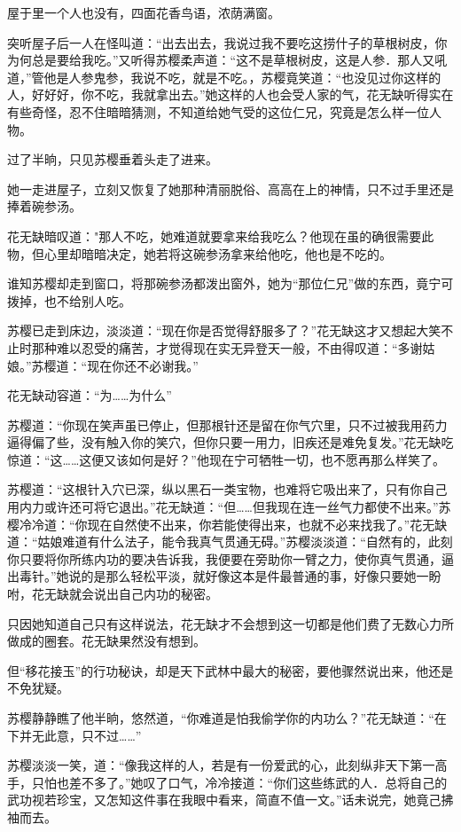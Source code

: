\documentclass[12pt,oneside]{book}
\begin{document}
屋于里一个人也没有，四面花香鸟语，浓荫满窗。

突听屋子后一人在怪叫道：``出去出去，我说过我不要吃这捞什子的草根树皮，你为何总是要给我吃。''又听得苏樱柔声道：``这不是草根树皮，这是人参．那人又吼道，''管他是人参鬼参，我说不吃，就是不吃。，苏樱竟笑道：``也没见过你这样的人，好好好，你不吃，我就拿出去。''她这样的人也会受人家的气，花无缺听得实在有些奇怪，忍不住暗暗猜测，不知道给她气受的这位仁兄，究竟是怎么样一位人物。

过了半晌，只见苏樱垂着头走了进来。

她一走进屋子，立刻又恢复了她那种清丽脱俗、高高在上的神情，只不过手里还是捧着碗参汤。

花无缺暗叹道："那人不吃，她难道就要拿来给我吃么？他现在虽的确很需要此物，但心里却暗暗决定，她若将这碗参汤拿来给他吃，他也是不吃的。

谁知苏樱却走到窗口，将那碗参汤都泼出窗外，她为``那位仁兄''做的东西，竟宁可拨掉，也不给别人吃。

苏樱已走到床边，淡淡道：``现在你是否觉得舒服多了？''花无缺这才又想起大笑不止时那种难以忍受的痛苦，才觉得现在实无异登天一般，不由得叹道：``多谢姑娘。''苏樱道：``现在你还不必谢我。''

花无缺动容道：``为\ldots\ldots 为什么''

苏樱道：``你现在笑声虽已停止，但那根针还是留在你气穴里，只不过被我用药力逼得偏了些，没有触入你的笑穴，但你只要一用力，旧疾还是难免复发。''花无缺吃惊道：``这\ldots\ldots 这便又该如何是好？''他现在宁可牺牲一切，也不愿再那么样笑了。

苏樱道：``这根针入穴已深，纵以黑石一类宝物，也难将它吸出来了，只有你自己用内力或许还可将它退出。''花无缺道：``但\ldots\ldots 但我现在连一丝气力都使不出来。''苏樱冷冷道：``你现在自然使不出来，你若能使得出来，也就不必来找我了。''花无缺道：``姑娘难道有什么法子，能令我真气贯通无碍。''苏樱淡淡道：``自然有的，此刻你只要将你所练内功的要决告诉我，我便要在旁助你一臂之力，使你真气贯通，逼出毒针。''她说的是那么轻松平淡，就好像这本是件最普通的事，好像只要她一盼咐，花无缺就会说出自己内功的秘密。

只因她知道自己只有这样说法，花无缺才不会想到这一切都是他们费了无数心力所做成的圈套。花无缺果然没有想到。

但``移花接玉''的行功秘诀，却是天下武林中最大的秘密，要他骤然说出来，他还是不免犹疑。

苏樱静静瞧了他半晌，悠然道，``你难道是怕我偷学你的内功么？''花无缺道：``在下并无此意，只不过\ldots\ldots{}''

苏樱淡淡一笑，道：``像我这样的人，若是有一份爱武的心，此刻纵非天下第一高手，只怕也差不多了。''她叹了口气，冷冷接道：``你们这些练武的人．总将自己的武功视若珍宝，又怎知这件事在我眼中看来，简直不值一文。''话未说完，她竟己拂袖而去。
\end{document}
